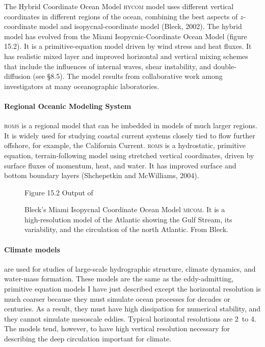 The Hybrid Coordinate Ocean Model \textsc{hycom} model uses different vertical coordinates in different regions of the ocean, combining the best aspects of $z$-coordinate model and isopycnal-coordinate model (Bleck, 2002). The hybrid model has evolved from the Miami Isopycnic-Coordinate Ocean Model (figure 15.2). It is a primitive-equation model driven by wind stress and heat fluxes. It has realistic mixed layer and improved horizontal and vertical mixing schemes that include the influences of internal waves, shear instability, and double-diffusion (see \S 8.5). The model results from collaborative work among investigators at many oceanographic laboratories.

\paragraph{Regional Oceanic Modeling System} \textsc{roms} is a regional model that can be imbedded in models of much larger regions. It is widely used  for studying coastal current systems closely tied to flow further offshore, for example, the California Current. \textsc{roms} is a hydrostatic, primitive equation, terrain-following model using stretched vertical coordinates, driven by surface fluxes of momentum, heat, and water. It has improved surface and bottom boundary layers (Shchepetkin and McWilliams, 2004). 

\begin{figure}[t!]
{}
\footnotesize
Figure 15.2  Output of\rule{0mm}{4ex} Bleck's Miami Isopycnal Coordinate Ocean
Model \textsc{micom}. It is a high-resolution model of the Atlantic showing the
Gulf Stream, its variability, and the
circulation of the north Atlantic. From Bleck.
\vspace{-3ex}
\label{fig:blecksgulfstream}
\end{figure}

\paragraph{Climate models} are used for studies of large-scale hydrographic structure, climate dynamics, and water-mass formation. These models are the same as the eddy-admitting, primitive equation models I have just described except the horizontal resolution is much coarser because they must simulate ocean processes for decades or centuries. As a result,  they must have high dissipation for numerical stability, and they cannot simulate mesoscale eddies. Typical horizontal resolutions are 2\degrees\ to 4\degrees. The models tend, however, to have high vertical resolution necessary for describing the deep circulation important for climate.

